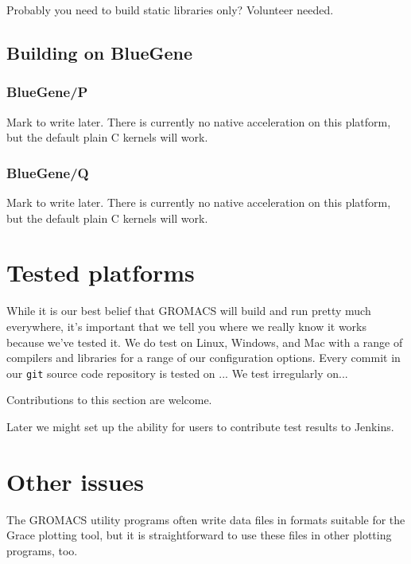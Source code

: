 \documentclass{article}[12pt,a4paper,twoside]
\newcommand{\gromacs}{GROMACS}
\newcommand{\grace}{Grace}
\begin{document}
Probably you need to build static libraries only? Volunteer needed.

\subsection{Building on BlueGene}

\subsubsection{BlueGene/P}

Mark to write later. There is currently no native acceleration on this
platform, but the default plain C kernels will work.

\subsubsection{BlueGene/Q}

Mark to write later. There is currently no native acceleration on this
platform, but the default plain C kernels will work.

\section{Tested platforms}

While it is our best belief that \gromacs{} will build and run pretty
much everywhere, it's important that we tell you where we really know
it works because we've tested it. We do test on Linux, Windows, and
Mac with a range of compilers and libraries for a range of our
configuration options. Every commit in our \texttt{git} source code
repository is tested on ... We test irregularly on...

Contributions to this section are welcome.

Later we might set up the ability for users to contribute test results
to Jenkins.

\section{Other issues}

The \gromacs{} utility programs often write data files in formats
suitable for the \grace{} plotting tool, but it is straightforward to
use these files in other plotting programs, too.
\end{document}
